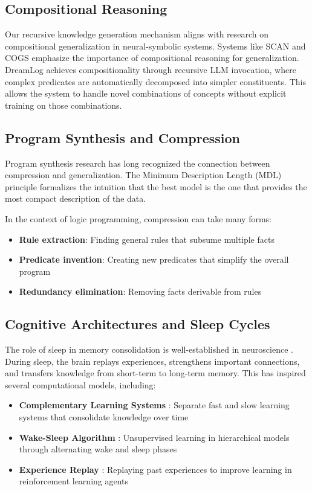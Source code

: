 \documentclass[10pt,conference]{IEEEtran}
\begin{document}
\subsection{Compositional Reasoning}

Our recursive knowledge generation mechanism aligns with research on compositional generalization in neural-symbolic systems. Systems like SCAN \cite{lake2017building} and COGS emphasize the importance of compositional reasoning for generalization. DreamLog achieves compositionality through recursive LLM invocation, where complex predicates are automatically decomposed into simpler constituents. This allows the system to handle novel combinations of concepts without explicit training on those combinations.

\subsection{Program Synthesis and Compression}

Program synthesis research \cite{gulwani2017program} has long recognized the connection between compression and generalization. The Minimum Description Length (MDL) principle \cite{grunwald2007minimum} formalizes the intuition that the best model is the one that provides the most compact description of the data.

In the context of logic programming, compression can take many forms:
\begin{itemize}
\item \textbf{Rule extraction}: Finding general rules that subsume multiple facts
\item \textbf{Predicate invention}: Creating new predicates that simplify the overall program
\item \textbf{Redundancy elimination}: Removing facts derivable from rules
\end{itemize}

\subsection{Cognitive Architectures and Sleep Cycles}

The role of sleep in memory consolidation is well-established in neuroscience \cite{walker2009role}. During sleep, the brain replays experiences, strengthens important connections, and transfers knowledge from short-term to long-term memory. This has inspired several computational models, including:

\begin{itemize}
\item \textbf{Complementary Learning Systems} \cite{mcclelland1995why}: Separate fast and slow learning systems that consolidate knowledge over time
\item \textbf{Wake-Sleep Algorithm} \cite{hinton1995wake}: Unsupervised learning in hierarchical models through alternating wake and sleep phases
\item \textbf{Experience Replay} \cite{andrychowicz2017hindsight}: Replaying past experiences to improve learning in reinforcement learning agents
\end{itemize}
\end{document}
